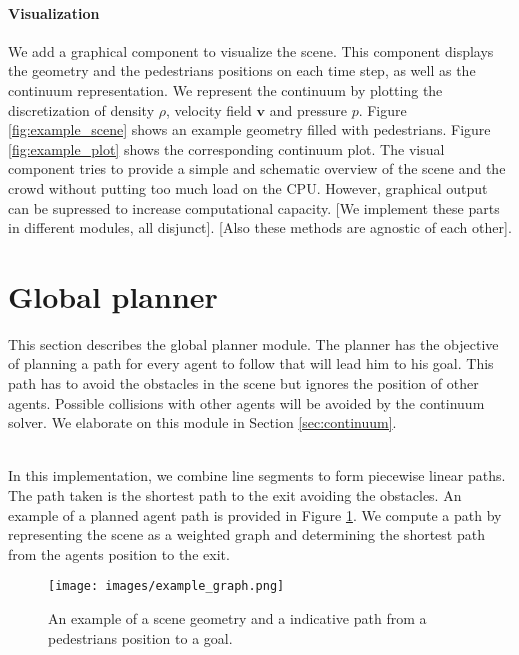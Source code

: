 \documentclass{article}
\renewcommand{\vec}[1]{\mathbf{#1}}
\begin{document}
\paragraph{Visualization}
We add a graphical component to visualize the scene. This component displays the geometry and the pedestrians positions on each time step, as well as the continuum representation. We represent the continuum by plotting the discretization of density $\rho$, velocity field $\vec{v}$ and pressure $p$. Figure \ref{fig:example_scene} shows an example geometry filled with pedestrians. Figure \ref{fig:example_plot} shows the corresponding continuum plot. 
The visual component tries to provide a simple and schematic overview of the scene and the crowd without putting too much load on the CPU. However, graphical output can be supressed to increase computational capacity.
[We implement these parts in different modules, all disjunct]. [Also these methods are agnostic of each other].
\newpage

\section{Global planner}
This section describes the global planner module. The planner has the objective of planning a path for every agent to follow that will lead him to his goal. This path has to avoid the obstacles in the scene but ignores the position of other agents. Possible collisions with other agents will be avoided by the continuum solver. We elaborate on this module in Section \ref{sec:continuum}.

\ \\
In this implementation, we combine line segments to form piecewise linear paths. The path taken is the shortest path to the exit avoiding the obstacles. An example of a planned agent path is provided in Figure \ref{fig:example_path}. We compute a path by representing the scene as a weighted graph and determining the shortest path from the agents position to the exit.
\begin{figure}[h]
	\centering
	\texttt{[image: images/example\_graph.png]}
	\caption{An example of a scene geometry and a indicative path from a pedestrians position to a goal.}
	\label{fig:example_path}
\end{figure}
\end{document}
